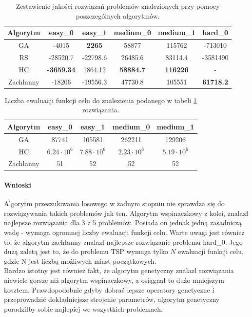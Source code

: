 \documentclass{article}
\begin{document}
	\begin{table}[H]
		\begin{center}
			\begin{tabular}{ |c|c|c|c|c|c| } 
				\hline
				Algorytm & easy\_0 & easy\_1 & medium\_0 & medium\_1 & hard\_0 \\ 
				\hline
				GA & -4015 & \textbf{2265} & 58877 & 115762 & -713010 \\ 
				RS & -28520.7 & -22798.6 & 26485.6 & 83114.4 & -3581490 \\ 
				HC & \textbf{-3659.34} & 1864.12 & \textbf{58884.7} & \textbf{116226} & - \\ 
				Zachłanny & -18206 & -19556.3 & 47730.8 & 105551 & \textbf{61718.2} \\ 
				\hline
			\end{tabular}
			\caption{Zestawienie jakości rozwiązań problemów znalezionych przy pomocy poszczególnych algorytmów.}
			\label{tab:nev}
		\end{center}
	\end{table}

	\begin{table}[H]
		\begin{center}
			\begin{tabular}{ |c|c|c|c|c| } 
				\hline
				Algorytm & easy\_0 & easy\_1 & medium\_0 & medium\_1\\
				\hline
				GA & 87741 & 105581 & 262211 & 129206\\
				HC & $6.24 \cdot 10^6$ & $7.88 \cdot 10^6$  & $2.23 \cdot 10^6$ & $5.19 \cdot 10^6$ \\
				Zachłanny & 51 & 52 & 52 & 52\\
				\hline
			\end{tabular}
			\caption{Liczba ewaluacji funkcji celu do znalezienia podanego w tabeli \ref{tab:nev} rozwiązania.}
			\label{tab:ffe}
		\end{center}
	\end{table}
	
	\paragraph{Wnioski}
	Algorytm przeszukiwania losowego w żadnym stopniu nie sprawdza się do rozwiązywania takich problemów jak ten. Algorytm wspinaczkowy z kolei, znalazł najlepsze rozwiązania dla 3 z 5 problemów. Posiada on jednak jedną zasadniczą wadę - wymaga ogromnej liczby ewaluacji funkcji celu. Warte uwagi jest również to, że algorytm zachłanny znalazł najlepsze rozwiązanie problemu hard\_0. Jego dużą zaletą jest to, że do problemu TSP wymaga tylko $N$ ewaluacji funkcji celu, gdzie N jest liczbą możliwych miast początkowych.\\
	Bardzo istotny jest również fakt, że algorytm genetyczny znalazł rozwiązania niewiele gorsze niż algorytm wspinaczkowy, a osiągnął to dużo mniejszym kosztem. Prawdopodobnie gdyby dobrać lepsze operatory genetyczne i przeprowadzić dokładniejsze strojenie parametrów, algorytm genetyczny poradziłby sobie najlepiej we wszystkich problemach.
\end{document}
